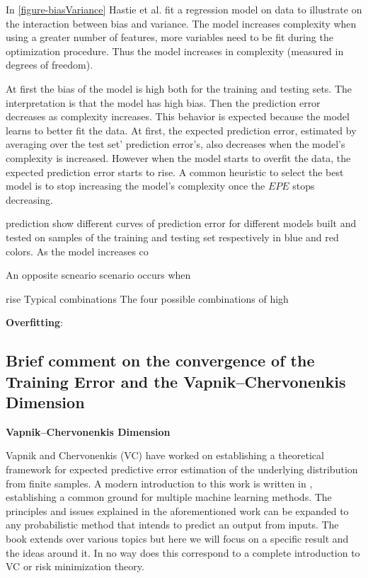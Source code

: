 In \ref{figure-biasVariance} Hastie et al. fit a regression model on data to illustrate on the interaction between bias and variance. The model increases complexity when using a greater number of features, more variables need to be fit during the optimization procedure. Thus the model increases in complexity (measured in degrees of freedom). 

At first the bias of the model is high both for the training and testing sets. The interpretation is that the model has high bias. Then the prediction error decreases as complexity increases. This behavior is expected because the model learns to better fit the data. At first, the expected prediction error, estimated by averaging over the test set' prediction error's, also decreases when the model's complexity is increased. However when the model starts to overfit the data, the expected prediction error starts to rise. A common heuristic to select the best model is to stop increasing the model's complexity once the $EPE$ stops decreasing.


prediction 
show different curves of prediction error for different models built and tested on samples of the training and testing set respectively in blue and red colors. As the model increases co

An opposite scneario scenario occurs when

rise Typical combinations
The four possible combinations of high 


\textbf{Overfitting}: 
 


\subsection{Brief comment on the convergence of the Training Error and the Vapnik–Chervonenkis Dimension}
\textbf{Vapnik–Chervonenkis Dimension}
\cite{vapnik-nature2013}
\cite{cherkassky-learning2007}

Vapnik and Chervonenkis (VC) have worked on establishing a theoretical framework for expected predictive error estimation of the underlying distribution from finite samples. A modern introduction to this work is written in \cite{cherkassky-learning2007}, establishing a common ground for multiple machine learning methods. The principles and issues explained in the aforementioned work can be expanded to any probabilistic method that intends to predict an output from inputs. The book extends over various topics but here we will focus on a specific result and the ideas around it. In no way does this correspond to a complete introduction to VC or risk minimization theory.

